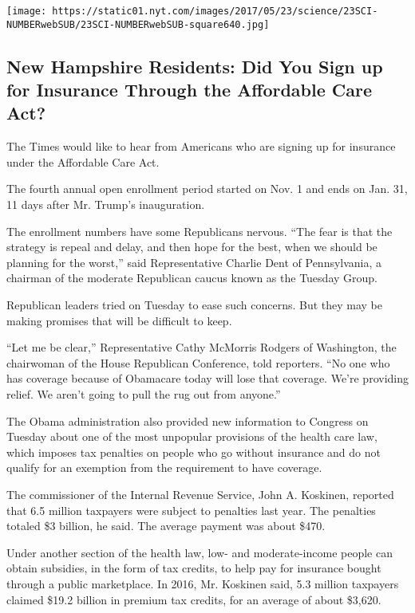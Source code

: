 \texttt{[image: https://static01.nyt.com/images/2017/05/23/science/23SCI-NUMBERwebSUB/23SCI-NUMBERwebSUB-square640.jpg]}

\hypertarget{new-hampshire-residents-did-you-sign-up-for-insurance-through-the-affordable-care-act}{%
\subsection{New Hampshire Residents: Did You Sign up for Insurance
Through the Affordable Care
Act?}\label{new-hampshire-residents-did-you-sign-up-for-insurance-through-the-affordable-care-act}}

The Times would like to hear from Americans who are signing up for
insurance under the Affordable Care Act.

The fourth annual open enrollment period started on Nov. 1 and ends on
Jan. 31, 11 days after Mr. Trump's inauguration.

The enrollment numbers have some Republicans nervous. ``The fear is that
the strategy is repeal and delay, and then hope for the best, when we
should be planning for the worst,'' said Representative Charlie Dent of
Pennsylvania, a chairman of the moderate Republican caucus known as the
Tuesday Group.

Republican leaders tried on Tuesday to ease such concerns. But they may
be making promises that will be difficult to keep.

``Let me be clear,'' Representative Cathy McMorris Rodgers of
Washington, the chairwoman of the House Republican Conference, told
reporters. ``No one who has coverage because of Obamacare today will
lose that coverage. We're providing relief. We aren't going to pull the
rug out from anyone.''

The Obama administration also provided new information to Congress on
Tuesday about one of the most unpopular provisions of the health care
law, which imposes tax penalties on people who go without insurance and
do not qualify for an exemption from the requirement to have coverage.

The commissioner of the Internal Revenue Service, John A. Koskinen,
reported that 6.5 million taxpayers were subject to penalties last year.
The penalties totaled \$3 billion, he said. The average payment was
about \$470.

Under another section of the health law, low- and moderate-income people
can obtain subsidies, in the form of tax credits, to help pay for
insurance bought through a public marketplace. In 2016, Mr. Koskinen
said, 5.3 million taxpayers claimed \$19.2 billion in premium tax
credits, for an average of about \$3,620.

